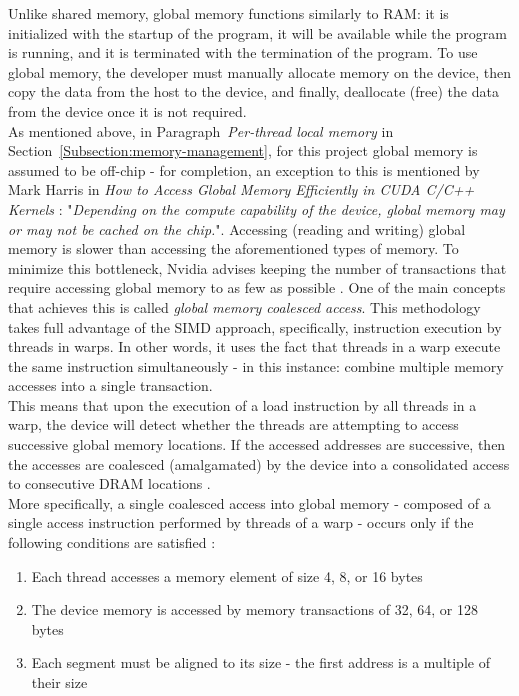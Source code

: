 Unlike shared memory, global memory functions similarly to RAM: it is initialized with the startup of the program, it will be available while the program is running, and it is terminated with the termination of the program. To use global memory, the developer must manually allocate memory on the device, then copy the data from the host to the device, and finally, deallocate (free) the data from the device \cite{Harris7January2013} once it is not required. \\
As mentioned above, in Paragraph~\emph{Per-thread local memory} in Section~\ref{Subsection:memory-management}, for this project global memory is assumed to be off-chip - for completion, an exception to this is mentioned by Mark Harris in \emph{How to Access Global Memory Efficiently in CUDA C/C++ Kernels} \cite{Harris7January2013}: "\textit{Depending on the compute capability of the device, global memory may or may not be cached on the chip.}". Accessing (reading and writing) global memory is slower than accessing the aforementioned types of memory. To minimize this bottleneck, Nvidia advises keeping the number of transactions that require accessing global memory to as few as possible \cite{Harris7January2013}. One of the main concepts that achieves this is called \textit{global memory coalesced access}. This methodology takes full advantage of the SIMD approach, specifically, instruction execution by threads in warps. In other words, it uses the fact that threads in a warp execute the same instruction simultaneously - in this instance: combine multiple memory accesses into a single transaction. \\
This means that upon the execution of a load instruction by all threads in a warp, the device will detect whether the threads are attempting to access successive global memory locations. If the accessed addresses are successive, then the accesses are coalesced (amalgamated) by the device into a consolidated access to consecutive DRAM locations \cite{Cabrera4December2019}. \\
More specifically, a single coalesced access into global memory - composed of a single access instruction performed by threads of a warp - occurs only if the following conditions are satisfied \cite{xUOrKLpxlGjvTonr, NVIDIAMay2022}:

\begin{enumerate}\label{Enumerate:theory-CUDA-global-memory-coalesced-access-requirements}
	\item Each thread accesses a memory element of size 4, 8, or 16 bytes
	\item The device memory is accessed by memory transactions of 32, 64, or 128 bytes
	\item Each segment must be aligned to its size - the first address is a multiple of their size
\end{enumerate}

